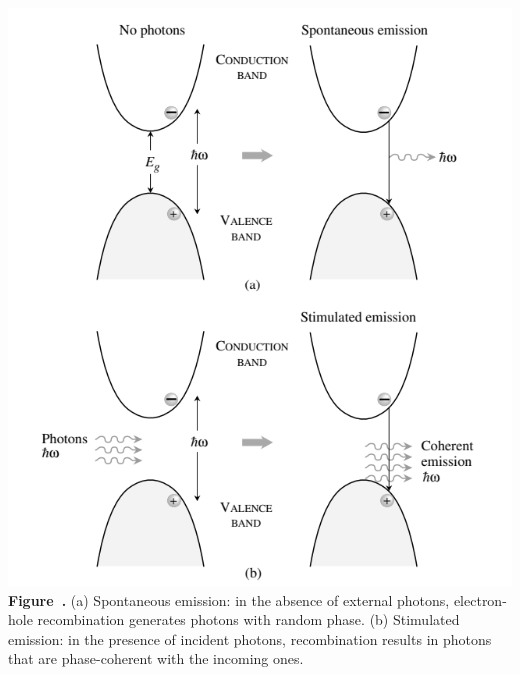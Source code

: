 \begin{center}
	\begin{minipage}{0.70\textwidth}
		\centering
		\includegraphics[width=\textwidth]{img/Spontaneus&Stimulated.png}
		\\[0.5em]
		\textbf{Figure~\thefigure.} (a) Spontaneous emission: in the absence of external photons, electron-hole recombination generates photons with random phase.
		(b) Stimulated emission: in the presence of incident photons, recombination results in photons that are phase-coherent with the incoming ones.
		\label{fig:Spontaneus&Stimulated}
	\end{minipage}
\end{center}

